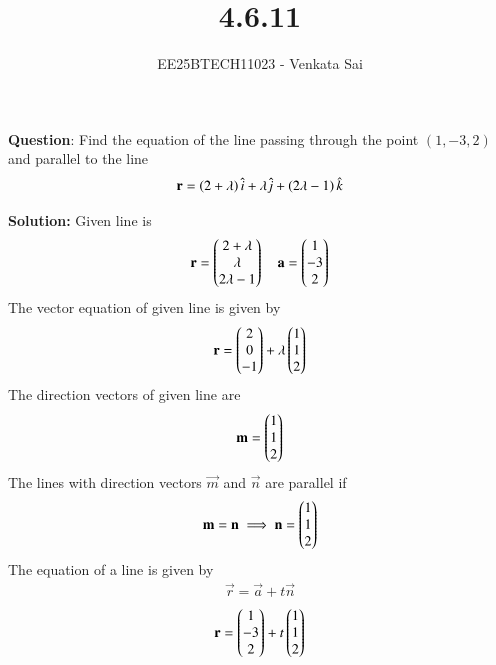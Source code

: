 \documentclass[journal]{IEEEtran}
\begin{document}


\title{4.6.11}
\author{EE25BTECH11023 - Venkata Sai}
{\let\newpage\relax\maketitle}

\renewcommand{\thefigure}{\theenumi}
\renewcommand{\thetable}{\theenumi}
\setlength{\intextsep}{10pt} %


\renewcommand{\thetable}{\theenumi}

\textbf{Question}:\newline
Find the equation of the line passing through the point $(1, -3, 2)$ and parallel to the line
\begin{align}
 \mathbf{r} = \left(2 + \lambda\right)\hat{i} + \lambda\hat{j} + \left(2\lambda - 1\right)\hat{k} 
\end{align}


\textbf{Solution: }
Given line is
\begin{align}
 \mathbf{r} = \begin{pmatrix}2+\lambda\\\lambda\\2\lambda-1\end{pmatrix} \quad \mathbf{a}=\begin{pmatrix}1\\-3\\2\end{pmatrix}
\end{align}
The vector equation of given line is given by
\begin{align}
\mathbf{r}=\begin{pmatrix}2\\0\\-1\end{pmatrix}+\lambda\begin{pmatrix}1\\1\\2\end{pmatrix}
\end{align}
The direction vectors of given line are
\begin{align}
    \mathbf{m}=\begin{pmatrix}1\\1\\2\end{pmatrix}
\end{align}
The lines with direction vectors $\vec{m}$ and $\vec{n}$ are parallel if
\begin{align}
\mathbf{m}=\mathbf{n}  \implies  \mathbf{n}=\begin{pmatrix}1\\1\\2\end{pmatrix}
\end{align}
The equation of a line is given by
\begin{align}
\vec{r}=\vec{a}+t\vec{n}
\end{align}
\begin{align}
\mathbf{r}=\begin{pmatrix}1\\-3\\2\end{pmatrix}+t\begin{pmatrix}1\\1\\2\end{pmatrix}
\end{align}
\end{document}
